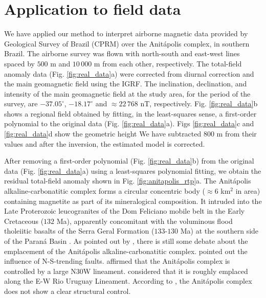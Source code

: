 \section{Application to field data}

We have applied our method to interpret airborne magnetic data provided by 
Geological Survey of Brazil (CPRM) over the Anit{\'a}polis complex, 
in southern Brazil. 
The airborne survey was flown with north-south and east-west lines spaced by $500$ m and $10\,000$ m from each other, respectively. 
The total-field anomaly data (Fig. \ref{fig:real_data}a) were corrected from diurnal correction and the main geomagnetic field using the IGRF. 
The inclination, declination, and intensity of the main geomagnetic field at the study area, 
for the period of the survey, are $-37.05^{\circ}$, $-18.17^{\circ}$ and 
$\approx 22 \, 768 $ nT, respectively.
Fig. \ref{fig:real_data}b shows a regional field obtained by fitting, in the least-squares sense, a first-order polynomial to the original data (Fig. \ref{fig:real_data}a).
Figs \ref{fig:real_data}c and \ref{fig:real_data}d show the geometric height
We have subtracted 800 m from their values and after the inversion, the estimated model is corrected.  

After removing a first-order polynomial (Fig. \ref{fig:real_data}b) from the original data  
(Fig. \ref{fig:real_data}a) using a least-squares polynomial fitting, we obtain the residual total-field anomaly shown in Fig. \ref{fig:anitapolis_rtp}a.
The Anit{\'a}polis alkaline-carbonatitic complex forms a circular concentric body 
($\approx 6$ km$^{2}$ in area) containing magnetite as part of its mineralogical 
composition. 
It intruded into the Late Proterozoic leucogranites of the Dom Feliciano 
mobile belt in the Early Cretaceous ($132$ Ma), apparently concomitant with the 
voluminous flood tholeiitic basalts of the Serra Geral Formation ($133$-$130$ Ma) 
at the southern side of the Paran{\'a} Basin \citep{gibson-1999, scheibe-etal2005}.
As pointed out by \citet{GOMES2018}, there is still some debate about the emplacement 
of the Anit{\'a}polis alkaline-carbonatitic complex. 
\citet{melcher-coutinho1966} pointed out the influence of N-S-trending faults.
\citet{horbach-marimon1980} affirmed that the Anit{\'a}polis complex is controlled by 
a large N30W lineament. 
\citet{scheibe-etal2005} considered that it is roughly emplaced along the E-W Rio 
Uruguay Lineament. 
According to \citet{riccomini-etal2005}, the Anit{\'a}polis 
complex does not show a clear structural control. 

